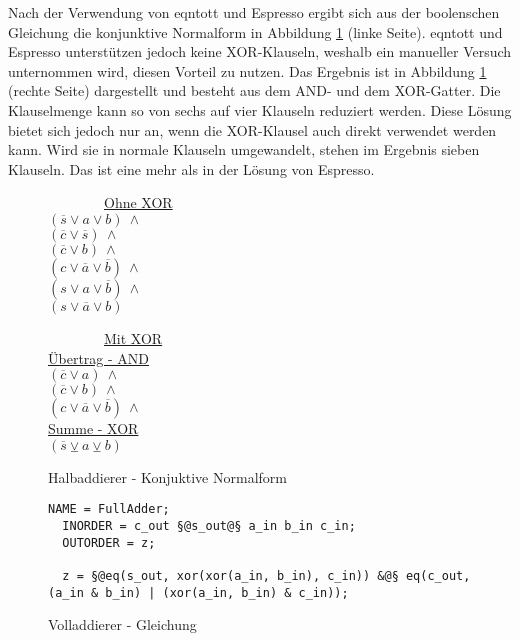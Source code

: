 Nach der Verwendung von eqntott und Espresso ergibt sich aus der boolenschen Gleichung die konjunktive Normalform in Abbildung \ref{fig:halfadder_cnf} (linke Seite).
eqntott und Espresso unterstützen jedoch keine XOR-Klauseln, weshalb ein manueller Versuch unternommen wird, diesen Vorteil zu nutzen. Das Ergebnis ist in Abbildung
\ref{fig:halfadder_cnf} (rechte Seite) dargestellt und besteht aus dem AND- und dem XOR-Gatter. Die Klauselmenge kann so von sechs auf vier Klauseln reduziert werden.
Diese Lösung bietet sich jedoch nur an, wenn die XOR-Klausel auch direkt verwendet werden kann. Wird sie in normale Klauseln umgewandelt, stehen im Ergebnis sieben
Klauseln. Das ist eine mehr als in der Lösung von Espresso.
\begin{figure}[!h]
  \centering
  \begin{minipage}[l]{5cm}
    ~~~~~~~~\underline{Ohne XOR}\\
    $ (\overline{s} \vee a \vee b) ~ \wedge $\\
    $ (\overline{c} \vee \overline{s}) ~ \wedge $\\
    $ (\overline{c} \vee b) ~ \wedge $\\
    $ (c \vee \overline{a} \vee \overline{b}) ~ \wedge $\\
    $ (s \vee a \vee \overline{b}) ~ \wedge $\\
    $ (s \vee \overline{a} \vee b) $
  \end{minipage}
  \begin{minipage}[l]{5cm}
    ~~~~~~~~\underline{Mit XOR}\\
    \underline{Übertrag - AND}\\
    $ (\overline{c} \vee a) ~ \wedge $\\
    $ (\overline{c} \vee b) ~ \wedge $\\
    $ (c \vee \overline{a} \vee \overline{b}) ~ \wedge $\\
    \underline{Summe - XOR}\\
    $ (\overline{s} \veebar a \veebar b) $
  \end{minipage}
  \caption{Halbaddierer - Konjuktive Normalform}
  \label{fig:halfadder_cnf}
\end{figure}

\begin{figure}[!h]
  \centering
  \begin{lstlisting}[]
  NAME = FullAdder;
  INORDER = c_out §@s_out@§ a_in b_in c_in;
  OUTORDER = z;

  z = §@eq(s_out, xor(xor(a_in, b_in), c_in)) &@§ eq(c_out, (a_in & b_in) | (xor(a_in, b_in) & c_in));
  \end{lstlisting}
  \caption{Volladdierer - Gleichung}
  \label{fig:fulladder_qen}
\end{figure}

